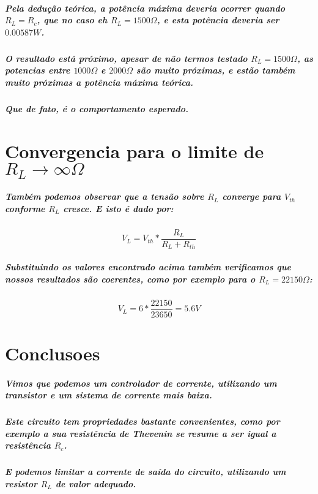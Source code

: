 \documentclass[12pt,twoside, a4paper, twocolumn]{article}
\begin{document}
\subparagraph*{Pela dedução teórica, a potência máxima deveria ocorrer quando $R_L = R_{c}$, que no caso eh $R_{L} = 1500 \varOmega$, e esta potência deveria ser $0.00587W$.}

\subparagraph*{O resultado está próximo, apesar de não termos testado $R_{L} = 1500\varOmega$, as potencias entre $1000\varOmega$ e $2000\varOmega$ são muito próximas, e estão também muito próximas a potência máxima teórica. }

\subparagraph*{Que de fato, é o comportamento esperado.}

\section{Convergencia para o limite de $R_L \rightarrow \infty\varOmega$}

\subparagraph*{Também podemos observar que a tensão sobre $R_L$ converge para $V_{th}$ conforme $R_L$ cresce. E isto é dado por:}

\begin{equation}
    V_{L} = V_{th} * \frac{R_{L}}{R_{L} + R_{th}}
\end{equation}

\subparagraph*{Substituindo os valores encontrado acima também verificamos que nossos resultados são coerentes, como por exemplo para o $R_L = 22150\varOmega$:}

\begin{equation}
    V_{L} = 6 * \frac{22150}{23650} = 5.6V
\end{equation}

\section{Conclusoes}

\subparagraph*{Vimos que podemos um controlador de corrente, utilizando um transistor e um sistema de corrente mais baixa.}

\subparagraph*{Este circuito tem propriedades bastante convenientes, como por exemplo a sua resistência de Thevenin se resume a ser igual a resistência $R_c$.}

\subparagraph*{E podemos limitar a corrente de saída do circuito, utilizando um resistor $R_L$ de valor adequado.}
\end{document}
